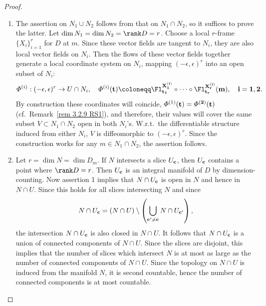 \begin{proof}
\begin{enumerate}
    \item The assertion on $N_1\cup N_2$ follows from that on $N_1\cap N_2$, so it suffices to prove the latter. Let $\dim N_1=\dim N_2=\rank D=r$. Choose a local $r$-frame $\{X_i\}_{i=1}^r$ for $D$ at $m$. Since these vector fields are tangent to $N_i$, they are also local vector fields on $N_i$. Then the flows of these vector fields together generate a local coordinate system on $N_i$, mapping $(-\epsilon,\epsilon)^r$ into an open subset of $N_i$:
    \[\varPhi^{(i)}:(-\epsilon,\epsilon)^r\to U\cap N_i,\quad \varPhi^{(i)}(\bf{t})\coloneqq \Fl^{X^{(i)}_1}_{t_1}\circ \cdots\circ \Fl^{X^{(i)}_r}_{t_r}(m),\quad i=1,2.\]
    By construction these coordinates will coincide, $\varPhi^{(1)}(\bf{t})=\varPhi^{(2)}(\bf{t})$ (cf.\ Remark~\ref{rem 3.2.9 RS1}), and therefore, their values will cover the same subset $V\subset N_1\cap N_2$ open in both $N_i$'s. W.r.t.~the differentiable structure induced from either $N_i$, $V$ is diffeomorphic to $(-\epsilon,\epsilon)^r$. Since the construction works for any $m\in N_1\cap N_2$, the assertion follows. 

    \item Let $r=\dim N=\dim D_m$. If $N$ intersects a slice $U_{\bf{c}}$, then $U_{\bf{c}}$ contains a point where $\rank D=r$. Then $U_{\bf{c}}$ is an integral manifold of $D$ by dimension-counting. Now assertion 1 implies that $N\cap U_{\bf{c}}$ is open in $N$ and hence in $N\cap U$. Since this holds for all slices intersecting $N$ and since
    \[N\cap U_{\bf{c}}=(N\cap U)\setminus\left(\bigcup_{\bf{c}'\neq \bf{c}}N\cap U_{\bf{c}'}\right),\]
    the intersection $N\cap U_{\bf{c}}$ is also closed in $N\cap U$. It follows that $N\cap U_{\bf{c}}$ is a union of connected components of $N\cap U$. Since the slices are disjoint, this implies that the number of slices which intersect $N$ is at most as large as the number of connected components of $N\cap U$. Since the topology on $N\cap U$ is induced from the manifold $N$, it is second countable, hence the number of connected components is at most countable.
\end{enumerate}
\end{proof}



